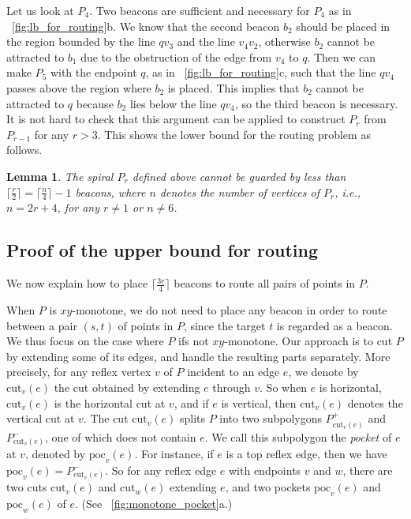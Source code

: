 \documentclass[11pt]{article}
\newcommand{\cut}{\ensuremath{\mathrm{cut}}}
\newcommand{\poc}{\ensuremath{\mathrm{poc}}}
\newtheorem{lemma}{Lemma}
\theoremstyle{definition}
\begin{document}
Let us look at $P_4$. Two beacons are sufficient and necessary for $P_4$ as in \figurename~\ref{fig:lb_for_routing}b. We know that the second beacon $b_2$ should be placed in the region bounded by the line $qv_3$ and the line $v_4v_2$, otherwise $b_2$ cannot be attracted to $b_1$ due to the obstruction of the edge from $v_4$ to $q$. Then we can make $P_5$ with the endpoint $q$, as in \figurename~\ref{fig:lb_for_routing}c, such that the line $qv_4$ passes above the region where $b_2$ is placed.  This implies that $b_2$ cannot be attracted to $q$ because $b_2$ lies below the line $qv_4$, so the third beacon is necessary. It is not hard to check that this argument can be applied to construct $P_r$ from $P_{r-1}$ for any $r>3$. This shows the lower bound for the routing problem as follows.

\begin{lemma} \label{lem:coverage_lower_bound}
 The spiral $P_r$ defined above cannot be guarded by less than
 $\lceil \frac{r}{2} \rceil = \lceil \frac{n}{4}\rceil-1$ beacons,
 where $n$ denotes the number of vertices of $P_r$, i.e., $n=2r+4$, for any $r \neq 1$ or $n\neq 6$.
\end{lemma}


\subsection{Proof of the upper bound for routing}

We now explain how to place $\lceil \frac{3r}{4}\rceil$ beacons to route all pairs of points in $P$.

When $P$ is $xy$-monotone, we do not need to place any beacon in order to route between
a pair $(s,t)$ of points in $P$, since the target $t$ is regarded as a beacon.
We thus focus on the case where $P$ ifs not $xy$-monotone. 
Our approach is to cut $P$ by extending some of its edges, and
handle the resulting parts separately. More precisely,
for any reflex vertex $v$ of $P$  incident to an edge $e$,
we denote by $\cut_v(e)$ the cut obtained by extending $e$ through $v$.
So when  $e$ is horizontal, $\cut_v(e)$ is the horizontal cut at $v$, and
if $e$ is vertical, then $\cut_v(e)$ denotes the vertical cut at $v$.
The cut $\cut_v(e)$ splits $P$ into two subpolygons $P^+_{\cut_v(e)}$ and $P^-_{\cut_v(e)}$,
one of which does not contain $e$.
We call this subpolygon the \emph{pocket} of $e$ at $v$, denoted by $\poc_v(e)$.
For instance, if $e$ is a top reflex edge, then we have $\poc_v(e) = P^-_{\cut_v(e)}$.
So for any reflex edge $e$ with endpoints $v$ and $w$,
there are two cuts $\cut_v(e)$ and $\cut_w(e)$ extending $e$, 
and two pockets $\poc_v(e)$ and $\poc_w(e)$ of $e$.
(See \figurename~\ref{fig:monotone_pocket}a.)
\end{document}
